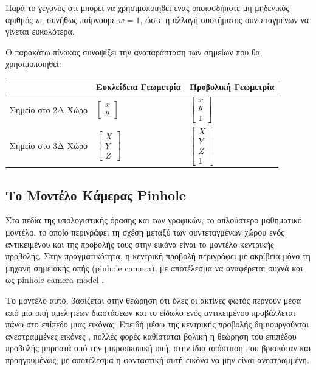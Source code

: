 Παρά το γεγονός ότι μπορεί να χρησιμοποιηθεί ένας οποιοσδήποτε μη μηδενικός αριθμός $w$, συνήθως παίρνουμε $w=1$, ώστε η αλλαγή συστήματος συντεταγμένων να γίνεται ευκολότερα.

Ο παρακάτω πίνακας συνοψίζει την αναπαράσταση των σημείων που θα χρησιμοποιηθεί:




\begin{tabu} to 0.9\textwidth { | X[l] | X[c,m] | X[c,m] | }
   \hline
    & Ευκλείδεια Γεωμετρία & \vspace{-0.3cm}Προβολική Γεωμετρία \\[0.5cm]
   \hline
   Σημείο στο 2Δ Χώρο  & $\begin{bmatrix} x \\ y\end{bmatrix}$  & $\begin{bmatrix} x \\ y\\1\end{bmatrix}$  \\[1cm]
   \hline
   Σημείο στο 3Δ Χώρο  & $\begin{bmatrix} X \\ Y \\ Z\end{bmatrix}$  & $\begin{bmatrix} X \\ Y\\Z\\1\end{bmatrix}$  \\[1cm]
   \hline
\end{tabu}






\subsection{Το Μοντέλο Κάμερας Pinhole}



Στα πεδία της υπολογιστικής όρασης και των γραφικών, το απλούστερο μαθηματικό μοντέλο, το οποίο περιγράφει τη σχέση μεταξύ των συντεταγμένων χώρου ενός αντικειμένου και της προβολής τους στην εικόνα είναι το μοντέλο κεντρικής προβολής. Στην πραγματικότητα, η κεντρική προβολή περιγράφει με ακρίβεια μόνο τη μηχανή σημειακής οπής (pinhole camera), με αποτέλεσμα να αναφέρεται συχνά και ως pinhole camera model \cite{hartley2003multiple} .


Το μοντέλο αυτό, βασίζεται στην θεώρηση ότι όλες οι ακτίνες φωτός περνούν μέσα από μία οπή αμελητέων διαστάσεων και το είδωλο ενός αντικειμένου προβάλλεται πάνω στο επίπεδο μιας εικόνας. Επειδή μέσω της κεντρικής προβολής δημιουργούνται ανεστραμμένες εικόνες \cite{fig:pinhole3}, πολλές φορές καθίσταται βολική η θεώρηση του επιπέδου προβολής μπροστά από την μικροσκοπική οπή, στην ίδια απόσταση που βρισκόταν και προηγουμένως, με αποτέλεσμα η φανταστική αυτή εικόνα να μην είναι ανεστραμμένη. 




